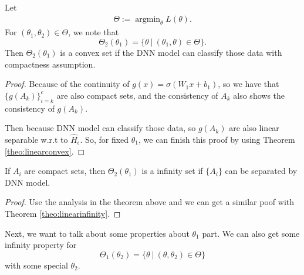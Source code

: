 \begin{theorem}Let
\begin{align}
\Theta := \mathop{\arg\min}_{\theta}L(\theta).
\end{align}
For $(\theta_1, \theta_2) \in \Theta$, we note that 
\begin{equation}
\Theta_2(\theta_1) = \{\theta ~|~ (\theta_1, \theta) \in \Theta \}.
\end{equation}
Then $\Theta_2(\theta_1)$ is a convex set if the DNN model can classify those data with compactness assumption.
\end{theorem}

\begin{proof}
Because of the continuity of $g(x) = \sigma(W_1x + b_1)$, so we have that $\{g(A_k)\}_{i=k}^c$ are also compact sets, and the consistency of $A_k$ also shows the consistency of $g(A_k)$. 

Then because DNN model can classify those data, so $g(A_k)$ are also linear separable w.r.t to $\hat{H}_\epsilon$.
So, for fixed $\theta_1$, we can finish this proof by using Theorem \ref{theo:linearconvex}.
\end{proof}

\begin{theorem}If $A_i$ are compact sets, then 
$\Theta_2(\theta_1)$ is a infinity set if $\{A_i\}$ can be separated by DNN model.
\end{theorem}
\begin{proof}Use the analysis in the theorem above and we can get a similar poof with Theorem \ref{theo:linearinfinity}.
\end{proof}


Next, we want to talk about some properties about $\theta_1$ part. We can also get some infinity property for 
\begin{equation}
\Theta_1(\theta_2) = \{\theta ~|~ (\theta, \theta_2) \in \Theta \}
\end{equation} with some special $\theta_2$.

